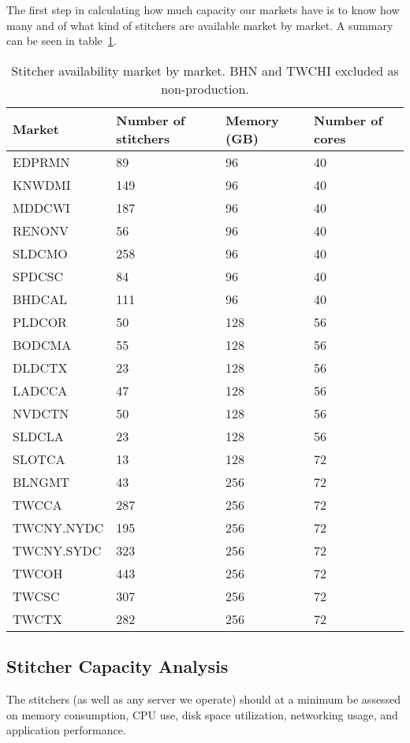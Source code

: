 \documentclass{article}
\begin{document}
The first step in calculating how much capacity our markets have is to know how many and of what kind of stitchers are available market by market. A summary can be seen in table~\ref{TABLE-marketStitcherAvail}.

\begin{table}
\begin{tabular}{|l|l|l|l|} 
\hline Market & Number of stitchers & Memory (GB) & Number of cores\\
\hline EDPRMN & 89 & 96 & 40\\
\hline KNWDMI & 149 & 96 & 40\\
\hline MDDCWI & 187 & 96 & 40\\
\hline RENONV & 56 & 96 & 40\\
\hline SLDCMO & 258 & 96 & 40\\
\hline SPDCSC & 84 & 96 & 40\\
\hline BHDCAL & 111 & 96 & 40\\
\hline PLDCOR & 50 & 128 & 56\\
\hline BODCMA & 55 & 128 & 56\\
\hline DLDCTX & 23 & 128 & 56\\
\hline LADCCA & 47 & 128 & 56\\
\hline NVDCTN & 50 & 128 & 56\\
\hline SLDCLA & 23 & 128 & 56\\
\hline SLOTCA & 13 & 128 & 72\\
\hline BLNGMT & 43 & 256 & 72\\
\hline TWCCA & 287 & 256 & 72\\
\hline TWCNY.NYDC & 195 & 256 & 72\\
\hline TWCNY.SYDC & 323 & 256 & 72\\
\hline TWCOH & 443 & 256 & 72\\
\hline TWCSC & 307 & 256 & 72\\
\hline TWCTX & 282 & 256 & 72\\
\hline 
\end{tabular}
\caption{\label{TABLE-marketStitcherAvail}Stitcher availability market by market. BHN and TWCHI excluded as non-production.} 
\end{table}

\subsection{Stitcher Capacity Analysis}
\label{SECTION-StitcherCapacity}

The stitchers (as well as any server we operate) should at a minimum be assessed on memory consumption, CPU use, disk space utilization, networking usage, and application performance. 
\end{document}
